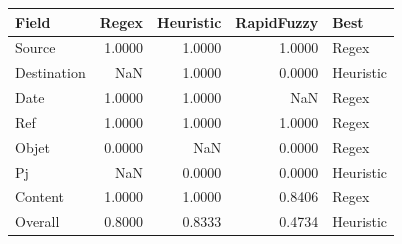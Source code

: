 \begin{tabular}{lrrrl}
\toprule
Field & Regex & Heuristic & RapidFuzzy & Best \\
\midrule
Source & 1.0000 & 1.0000 & 1.0000 & Regex \\
Destination & NaN & 1.0000 & 0.0000 & Heuristic \\
Date & 1.0000 & 1.0000 & NaN & Regex \\
Ref & 1.0000 & 1.0000 & 1.0000 & Regex \\
Objet & 0.0000 & NaN & 0.0000 & Regex \\
Pj & NaN & 0.0000 & 0.0000 & Heuristic \\
Content & 1.0000 & 1.0000 & 0.8406 & Regex \\
Overall & 0.8000 & 0.8333 & 0.4734 & Heuristic \\
\bottomrule
\end{tabular}
